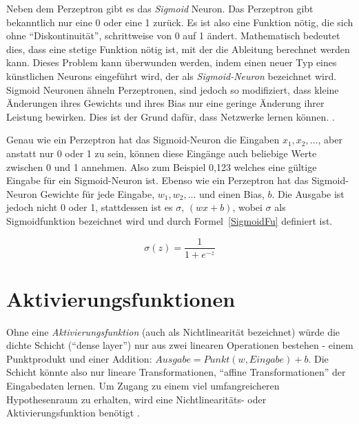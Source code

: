 Neben dem Perzeptron gibt es das \textit{Sigmoid} Neuron. Das Perzeptron gibt bekanntlich nur eine 0 oder eine 1 zurück. Es ist also eine Funktion nötig, die sich ohne \enquote{Diskontinuität}, schrittweise von 0 auf 1 ändert. Mathematisch bedeutet dies, dass eine stetige Funktion nötig ist, mit der die Ableitung berechnet werden kann. Dieses Problem kann überwunden werden, indem einen neuer Typ eines künstlichen Neurons eingeführt wird, der als \textit{Sigmoid-Neuron} bezeichnet wird. Sigmoid Neuronen ähneln Perzeptronen, sind jedoch so modifiziert, dass kleine Änderungen ihres Gewichts und ihres Bias nur eine geringe Änderung ihrer Leistung bewirken. Dies ist der Grund dafür, dass Netzwerke lernen können. \cite*[8]{Nielsen2015}.



Genau wie ein Perzeptron hat das Sigmoid-Neuron die Eingaben $x_1, x_2, ...$, aber anstatt nur 0 oder 1 zu sein, können diese Eingänge auch beliebige Werte zwischen 0 und 1 annehmen. Also zum Beispiel 0,123 welches eine gültige Eingabe für ein Sigmoid-Neuron ist. Ebenso wie ein Perzeptron hat das Sigmoid-Neuron Gewichte für jede Eingabe, $w_1, w_2, ...$ und einen Bias, $b$. Die Ausgabe ist jedoch nicht 0 oder 1, stattdessen ist es $\sigma$, $(wx + b)$, wobei $\sigma$ als Sigmoidfunktion bezeichnet wird und durch Formel~\ref{SigmoidFu} definiert ist.

\begin{equation} \label{SigmoidFu}
    \sigma (z) = \frac{1}{1+e^{-z}}
\end{equation}



\section{Aktivierungsfunktionen}
Ohne eine \textit{Aktivierungsfunktion} (auch als Nichtlinearität bezeichnet) würde die dichte Schicht (\enquote{dense layer}) nur aus zwei linearen Operationen bestehen - einem Punktprodukt und einer Addition: $Ausgabe = Punkt (w, Eingabe) + b$. Die Schicht könnte also nur lineare Transformationen, \enquote{affine Transformationen} der Eingabedaten lernen. Um Zugang zu einem viel umfangreicheren Hypothesenraum zu erhalten, wird eine Nichtlinearitäts- oder Aktivierungsfunktion benötigt \cite*[S. 72]{Chollet2017}.

